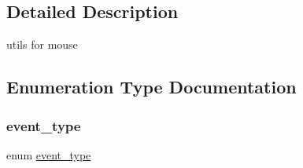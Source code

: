 \subsection{Detailed Description}
utils for mouse 

\subsection{Enumeration Type Documentation}
\mbox{\label{group__mouse_ga430b444c74dd3fd1472a31714ec5f1ce}} 
\subsubsection{\texorpdfstring{event\_type}{event\_type}}
{\footnotesize\ttfamily enum \mbox{\hyperlink{group__mouse_ga430b444c74dd3fd1472a31714ec5f1ce}{event\+\_\+type}}}

